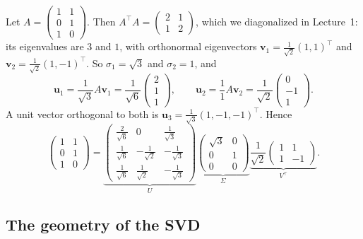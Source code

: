 \begin{example}\label{L2-ex:svd-3x2}
    Let $A = \begin{pmatrix} 1 & 1 \\ 0 & 1 \\ 1 & 0 \end{pmatrix}$. Then $A^\top A = \begin{pmatrix} 2 & 1 \\ 1 & 2 \end{pmatrix}$, which we diagonalized in Lecture~1: its eigenvalues are $3$ and $1$, with orthonormal eigenvectors $\mathbf{v}_1 = \frac{1}{\sqrt{2}}(1, 1)^\top$ and $\mathbf{v}_2 = \frac{1}{\sqrt{2}}(1, -1)^\top$. So $\sigma_1 = \sqrt{3}$ and $\sigma_2 = 1$, and
    \[\mathbf{u}_1 = \frac{1}{\sqrt{3}} A \mathbf{v}_1 = \frac{1}{\sqrt{6}} \begin{pmatrix} 2 \\ 1 \\ 1 \end{pmatrix}, \qquad \mathbf{u}_2 = \frac{1}{1} A \mathbf{v}_2 = \frac{1}{\sqrt{2}} \begin{pmatrix} 0 \\ -1 \\ 1 \end{pmatrix}.\]
    A unit vector orthogonal to both is $\mathbf{u}_3 = \frac{1}{\sqrt{3}}(1, -1, -1)^\top$. Hence
    \[\begin{pmatrix} 1 & 1 \\ 0 & 1 \\ 1 & 0 \end{pmatrix} = \underbrace{\begin{pmatrix} \frac{2}{\sqrt{6}} & 0 & \frac{1}{\sqrt{3}} \\ \frac{1}{\sqrt{6}} & -\frac{1}{\sqrt{2}} & -\frac{1}{\sqrt{3}} \\ \frac{1}{\sqrt{6}} & \frac{1}{\sqrt{2}} & -\frac{1}{\sqrt{3}} \end{pmatrix}}_{U} \underbrace{\begin{pmatrix} \sqrt{3} & 0 \\ 0 & 1 \\ 0 & 0 \end{pmatrix}}_{\Sigma} \underbrace{\frac{1}{\sqrt{2}}\begin{pmatrix} 1 & 1 \\ 1 & -1 \end{pmatrix}}_{V^\top}.\]
\end{example}

\subsection{The geometry of the SVD}

